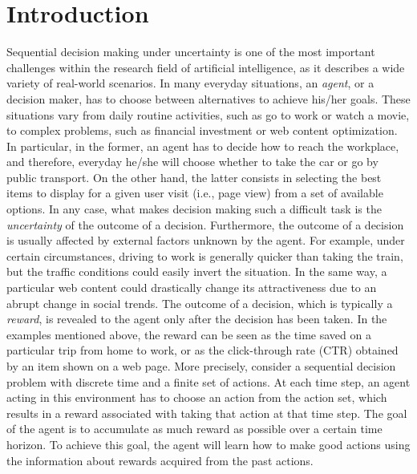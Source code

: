 \chapter{Introduction}





Sequential decision making under uncertainty is one of the most important challenges within the research field of artificial intelligence, as it describes a wide variety of real-world scenarios. In many everyday situations, an \emph{agent}, or a decision maker, has to choose between alternatives to achieve his/her goals. These situations vary from daily routine activities, such as go to work or watch a movie, to complex problems, such as financial investment or web content optimization. In particular, in the former, an agent has to decide how to reach the workplace, and therefore, everyday he/she will choose whether to take the car or go by public transport. On the other hand, the latter consists in selecting the best items to display for a given user visit (i.e., page view) from a set of available options. In any case, what makes decision making such a difficult task is the \emph{uncertainty} of the outcome of a decision. Furthermore, the outcome of a decision is usually affected by external factors unknown by the agent.
For example, under certain circumstances, driving to work is generally quicker than taking the train, but the traffic conditions could easily invert the situation. In the same way, a particular web content could drastically change its attractiveness due to an abrupt change in social trends. The outcome of a decision, which is typically a \emph{reward}, is revealed to the agent only after the decision has been taken. In the examples mentioned above, the reward can be seen as the time saved on a particular trip from home to work, or as the click-through rate (CTR) obtained by an item shown on a web page. More precisely, consider a sequential decision problem with discrete time and a finite set of actions. At each time step, an agent acting in this environment has to choose an action from the action set,  which results in a reward associated with taking that action at that time step. The goal of the agent is to accumulate as much reward as possible over a certain time horizon. To achieve this goal, the agent will learn how to make good actions using the information about rewards acquired from the past actions.
\\%
